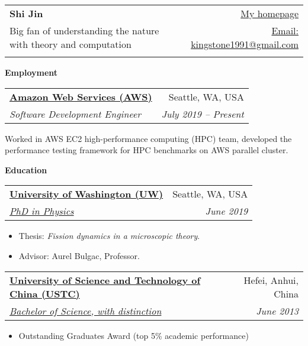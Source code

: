 \documentclass[letterpaper,12pt]{article}
\makeatletter
\newcommand{\resheading}[1]{{\large \colorbox{mygrey}{\begin{minipage}{\textwidth}{\textbf{#1 \vphantom{p\^{E}}}}\end{minipage}}}}
\newcommand{\ressubheading}[4]{
\begin{tabular*}{6.5in}{l@{\extracolsep{\fill}}r}
		\textbf{#1} & #2 \\
		\textit{#3} & \textit{#4} \\
\end{tabular*}\vspace{-6pt}}
\makeatother
\begin{document}
\newcommand{\mywebheader}{
\begin{tabular*}{7in}{l@{\extracolsep{\fill}}r}
	\textbf{{\huge Shi Jin}} & \href{http://students.washington.edu/js1421/}{My homepage}\\
{\footnotesize Big fan of understanding the nature with theory and computation} &   \href{mailto:kingstone1991@gmail.com}{Email: kingstone1991@gmail.com} \\
  & \Mobilefone{ Cell phone: $\mathnormal{+1}$ $\mathnormal{2066050419}$}
	\end{tabular*}
	\vspace{1cm}}

\mywebheader

\resheading{Employment}	

\vspace{0.2cm}

\ressubheading{\href{https://aws.amazon.com/}{Amazon Web Services (AWS) }}{\hspace{8.8cm} Seattle, WA, USA}
{Software Development Engineer}{July 2019 -- Present}

\vspace{0.4cm}

Worked in AWS EC2 high-performance computing (HPC) team, developed the performance testing framework for HPC benchmarks on AWS parallel cluster.

\vspace{0.4cm}

\resheading{Education}	

\vspace{0.2cm}

\ressubheading{\href{http://www.uw.edu}{University of Washington (UW) }}{\hspace{7.7cm} Seattle, WA, USA}{\href{https://sharepoint.washington.edu/phys/Pages/default.aspx}{PhD in Physics}}{\hspace{7.5cm} June 2019 }
			\begin{itemize}
			\itemsep0em
	\item
	Thesis: \textit{Fission dynamics in a microscopic theory}.
	\item
	 Advisor: Aurel Bulgac, Professor.		 	  
        \end{itemize}
				
\ressubheading{\href{http://en.ustc.edu.cn}{University of Science and Technology of China (USTC) }}{\hspace{2.5cm} Hefei, Anhui, China}{\href{http://physics.ustc.edu.cn}{Bachelor of Science, with distinction }}{\hspace{2.5cm} June 2013}
\begin{itemize}
\item
Outstanding Graduates Award (top 5\% academic performance)
\end{itemize}
				
\end{document}
